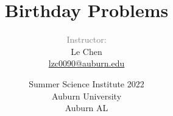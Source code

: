 


\title %
{
  Birthday Problems \\
  \bigskip
  \small
}


\author{\textcolor{gray}{Instructor:}\\[1em]
  Le Chen\\
{\small\url{lzc0090@auburn.edu}}
}



\date[Auburn]{Summer Science Institute 2022\\Auburn University\\ Auburn AL}



